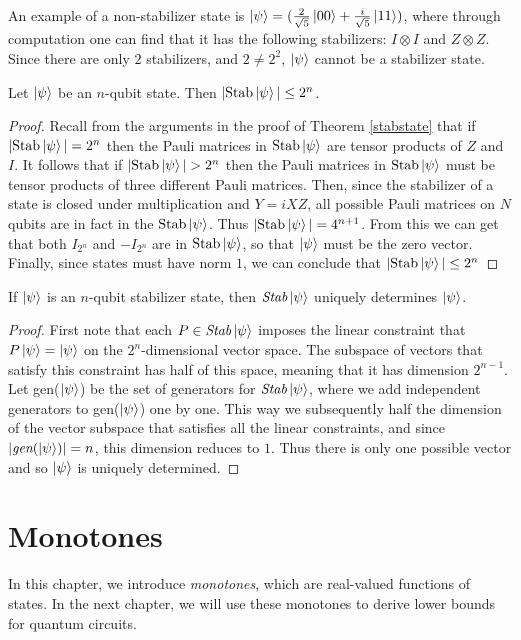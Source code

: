 \documentclass[12pt]{dalthesis}
\begin{document}
An example of a non-stabilizer state is $\ket{\psi} = (\frac{2}{\sqrt{5}}\ket{00} + \frac{i}{\sqrt{5}} \ket{11})$, where through computation one can find that it has the following stabilizers: $I \otimes I$ and $Z \otimes Z$. Since there are only $2$ stabilizers, and $2 \neq 2^2$, $\ket{\psi}$ cannot be a stabilizer state.

\begin{lemma}
\label{StabSize}
Let $\ket{\psi}$ be an $n$-qubit state. Then $|\mathrm{Stab} \ket{\psi}| \leq 2^n$.  
\end{lemma}
\begin{proof}
Recall from the arguments in the proof of Theorem \ref{stabstate} that if $|\mathrm{Stab} \ket{\psi}| = 2^n$ then the Pauli matrices in $\mathrm{Stab} \ket{\psi}$ are tensor products of $Z$ and $I$. It follows that if $|\mathrm{Stab} \ket{\psi}| > 2^n$ then the Pauli matrices in $\mathrm{Stab} \ket{\psi}$ must be tensor products of three different Pauli matrices. Then, since the stabilizer of a state is closed under multiplication and $Y = iXZ$, all possible Pauli matrices on $N$ qubits are in fact in the $\mathrm{Stab} \ket{\psi}$. Thus $|\mathrm{Stab} \ket{\psi}| = 4^{n+1}$. From this we can get that both $I_{2^n}$ and $-I_{2^n}$ are in $\mathrm{Stab} \ket{\psi}$, so that $\ket{\psi}$ must be the zero vector. Finally, since states must have norm $1$, we can conclude that $|\mathrm{Stab} \ket{\psi}| \leq 2^n$ 
\end{proof}

\begin{theorem}
If $\ket{\psi}$ is an $n$-qubit stabilizer state, then $\textit{Stab}\ket{\psi}$ uniquely determines $\ket{\psi}$.
\end{theorem}
\begin{proof}
First note that each $P \in \textit{Stab}\ket{\psi}$ imposes the linear constraint that $P\ket{\psi} = \ket{\psi}$ on the $2^n$-dimensional vector space. The subspace of vectors that satisfy this constraint has half of this space, meaning that it has dimension $2^{n-1}$. Let gen($\ket{\psi}$) be the set of generators for $\textit{Stab}\ket{\psi}$, where we add independent generators to gen($\ket{\psi}$) one by one. This way we subsequently half the dimension of the vector subspace that satisfies all the linear constraints, and since $|\textit{gen}(\ket{\psi})| = n$, this dimension reduces to $1$. Thus there is only one possible vector and so $\ket{\psi}$ is uniquely determined.
\end{proof}

\chapter{Monotones}
\label{monotones}
In this chapter, we introduce \emph{monotones}, which are real-valued functions of states. In the next chapter, we will use these monotones to derive lower bounds for quantum circuits.  
\end{document}
